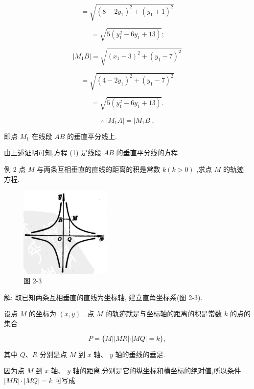 \documentclass[lang=cn,newtx,10pt,scheme=chinese]{elegantbook}
\begin{document}
\[
  = \sqrt{{\left( 8 - 2{y}_{1}\right) }^{2} + {\left( {y}_{1} + 1\right) }^{2}}
\]

\[
  = \sqrt{5\left( {{y}_{1}^{2} - 6{y}_{1} + {13}}\right) }\text{;}
\]

\[
  \left| {{M}_{1}B}\right| = \sqrt{{\left( {x}_{1} - 3\right) }^{2} + {\left( {y}_{1} - 7\right) }^{2}}
\]

\[
  = \sqrt{{\left( 4 - 2{y}_{1}\right) }^{2} + {\left( {y}_{1} - 7\right) }^{2}}
\]

\[
  = \sqrt{5\left( {{y}_{1}^{2} - 6{y}_{1} + {13}}\right) }\text{.}
\]

\[
  \therefore \;\left| {{M}_{1}A}\right| = \left| {{M}_{1}B}\right| \text{,}
\]

即点 \({M}_{1}\) 在线段 \({AB}\) 的垂直平分线上.

由上述证明可知,方程 (1) 是线段 \({AB}\) 的垂直平分线的方程.

例 2 点 \(M\) 与两条互相垂直的直线的距离的积是常数 \(k\left( {k > 0}\right)\) ,求点 \(M\) 的轨迹方程.

\begin{figure}[h]
  \centering
  \includegraphics[max width=0.4\textwidth]{images/01912cc2-ffb6-728e-9ae7-b113ff05c64b_68_272250.jpg}
  \caption{图 2-3}
\end{figure}



解: 取已知两条互相垂直的直线为坐标轴, 建立直角坐标系(图 2-3).

设点 \(M\) 的坐标为 \(\left( {x,y}\right)\) . 点 \(M\) 的轨迹就是与坐标轴的距离的积是常数 \(k\) 的点的集合

\[
  P = \{ M\left| \right| {MR}\left| \cdot \right| {MQ} \mid = k\} ,
\]

其中 \(Q\text{、}R\) 分别是点 \(M\) 到 \(x\) 轴、 \(y\) 轴的垂线的垂足.

因为点 \(M\) 到 \(x\) 轴、 \(y\) 轴的距离,分别是它的纵坐标和横坐标的绝对值,所以条件 \(\left| {MR}\right| \cdot \left| {MQ}\right| = k\) 可写成
\end{document}
